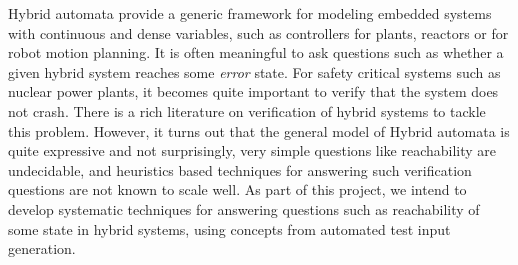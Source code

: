 
Hybrid automata provide a generic framework for modeling embedded systems with continuous and dense variables, such as controllers for plants, reactors or for robot motion planning.
It is often meaningful to ask questions such as whether a given hybrid system reaches some \emph{error} state. For safety critical systems such as nuclear power plants, it becomes quite important to verify that the system does not crash. There is a rich literature on verification of hybrid systems to tackle this problem. However, it turns out that the general model of Hybrid automata is quite expressive and not surprisingly, very simple questions like reachability are undecidable, and heuristics based techniques for answering such verification questions are not known to scale well.
As part of this project, we intend to develop systematic techniques for answering questions such as reachability of some state in hybrid systems, using concepts from automated test input generation.
